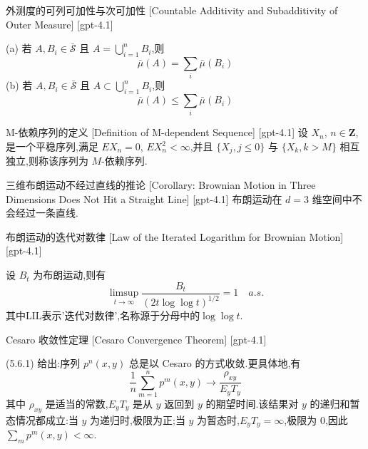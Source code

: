 \documentclass[UTF8]{ctexart}
\begin{document}
    
    
    \begin{ppt}
        {外测度的可列可加性与次可加性}
        [Countable Additivity and Subadditivity of Outer Measure]
        [gpt-4.1]
        
(a) 若 $A, B _ { i } \in \bar { \mathcal { S } }$ 且 $A = \bigcup_{i = 1}^{n} B_{i}$,则
\[
\bar{\mu}(A) = \sum_{i} \bar{\mu}(B_{i})
\]
(b) 若 $A, B _ { i } \in \bar { \mathcal { S } }$ 且 $A \subset \bigcup_{i = 1}^{n} B_{i}$,则
\[
\bar{\mu}(A) \leq \sum_{i} \bar{\mu}(B_{i})
\]

    \end{ppt}
    
    
    
    \begin{dfn}
        {M-依赖序列的定义}
        [Definition of M-dependent Sequence]
        [gpt-4.1]
        设 $X_{n}$, $n \in \mathbf{Z}$, 是一个平稳序列,满足 $EX_{n} = 0$, $EX_{n}^{2} < \infty$,并且 $\{X_{j}, j \le 0\}$ 与 $\{X_{k}, k > M\}$ 相互独立,则称该序列为 $M$-依赖序列.
    \end{dfn}
    
    
    
    \begin{crl}
        {三维布朗运动不经过直线的推论}
        [Corollary: Brownian Motion in Three Dimensions Does Not Hit a Straight Line]
        [gpt-4.1]
        布朗运动在 $d = 3$ 维空间中不会经过一条直线.
    \end{crl}
    
    
    
    \begin{thm}
        {布朗运动的迭代对数律}
        [Law of the Iterated Logarithm for Brownian Motion]
        [gpt-4.1]
        
设 $B_t$ 为布朗运动,则有
\[
\limsup_{t \to \infty} \frac{B_t}{\left(2t \log\log t\right)^{1/2}} = 1 \quad a.s.
\]
其中LIL表示'迭代对数律',名称源于分母中的$\log\log t$.

    \end{thm}
    
    
    
    \begin{thm}
        {Cesaro 收敛性定理}
        [Cesaro Convergence Theorem]
        [gpt-4.1]
        
(5.6.1) 给出:序列 $p^n(x, y)$ 总是以 Cesaro 的方式收敛.更具体地,有
\[
\frac{1}{n} \sum_{m=1}^n p^m(x, y) \to \frac{\rho_{xy}}{E_y T_y}
\]
其中 $\rho_{xy}$ 是适当的常数,$E_y T_y$ 是从 $y$ 返回到 $y$ 的期望时间.该结果对 $y$ 的递归和暂态情况都成立:当 $y$ 为递归时,极限为正;当 $y$ 为暂态时,$E_y T_y = \infty$,极限为 0,因此 $\displaystyle\sum_{m} p^m(x, y) < \infty$.

    \end{thm}
    
\end{document}
